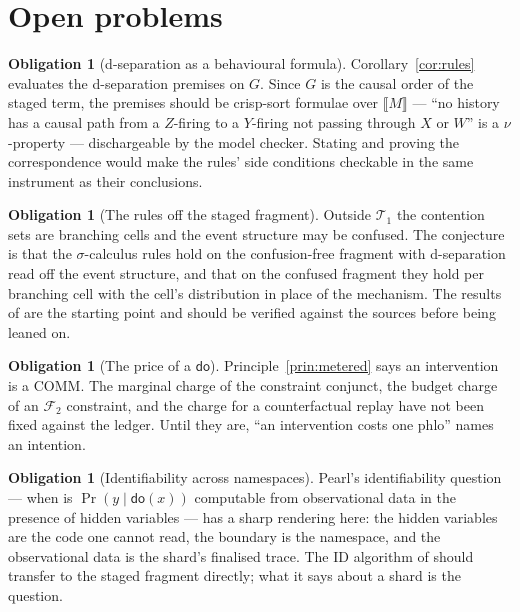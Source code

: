 \documentclass[11pt,a4paper]{article}
\theoremstyle{plain}
\theoremstyle{definition}
\newtheorem{obligation}[theorem]{Obligation}
\theoremstyle{remark}
\newcommand{\sem}[1]{\llbracket #1 \rrbracket}
\newcommand{\dok}{\textsf{do}}
\begin{document}
\section{Open problems}\label{sec:open}

\begin{obligation}[d-separation as a behavioural formula]\label{ob:dsep}
Corollary~\ref{cor:rules} evaluates the d-separation premises on $G$. Since
$G$ is the causal order of the staged term, the premises should be crisp-sort
formulae over $\sem{M}$ --- ``no history has a causal path from a $Z$-firing to a
$Y$-firing not passing through $X$ or $W$'' is a $\nu$-property --- dischargeable
by the model checker. Stating and proving the correspondence would make the
rules' side conditions checkable in the same instrument as their conclusions.
\end{obligation}

\begin{obligation}[The rules off the staged fragment]\label{ob:general}
Outside $\mathcal{T}_1$ the contention sets are branching cells and the event
structure may be confused. The conjecture is that the $\sigma$-calculus rules
hold on the confusion-free fragment with d-separation read off the event
structure, and that on the confused fragment they hold per branching cell with
the cell's distribution in place of the mechanism. The results of
\cite{VaraccaVolzerWinskel,AbbesBenveniste} are the starting point and should
be verified against the sources before being leaned on.
\end{obligation}

\begin{obligation}[The price of a $\dok$]\label{ob:price}
Principle~\ref{prin:metered} says an intervention is a COMM. The marginal
charge of the constraint conjunct, the budget charge of an $\mathcal{F}_2$
constraint, and the charge for a counterfactual replay have not been fixed
against the ledger. Until they are, ``an intervention costs one phlo'' names an
intention.
\end{obligation}

\begin{obligation}[Identifiability across namespaces]\label{ob:ident}
Pearl's identifiability question --- when is $\Pr(y \mid \dok(x))$ computable
from observational data in the presence of hidden variables --- has a sharp
rendering here: the hidden variables are the code one cannot read, the boundary
is the namespace, and the observational data is the shard's finalised trace.
The ID algorithm of \cite{ShpitserPearl} should transfer to the staged fragment
directly; what it says about a shard is the question.
\end{obligation}
\end{document}
